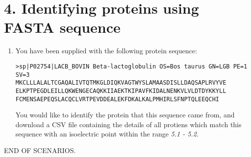 \section*{4. Identifying proteins using FASTA sequence}
\begin{enumerate}
\item You have been supplied with the following protein sequence:
\begin{verbatim}
>sp|P02754|LACB_BOVIN Beta-lactoglobulin OS=Bos taurus GN=LGB PE=1 SV=3
MKCLLLALALTCGAQALIVTQTMKGLDIQKVAGTWYSLAMAASDISLLDAQSAPLRVYVE
ELKPTPEGDLEILLQKWENGECAQKKIIAEKTKIPAVFKIDALNENKVLVLDTDYKKYLL
FCMENSAEPEQSLACQCLVRTPEVDDEALEKFDKALKALPMHIRLSFNPTQLEEQCHI
\end{verbatim}

You would like to identify the protein that this sequence came from,
and download a CSV file containing the details of all protiens which
match this sequence with an isoelectric point within the range
\textit{5.1 - 5.2}.
\end{enumerate}

{\centering END OF SCENARIOS.\par}
